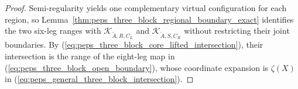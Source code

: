 \begin{proof}\leanok
    Semi-regularity yields one complementary virtual configuration for
    each region, so Lemma~\ref{thm:peps_three_block_regional_boundary_exact}
    identifies the two six-leg ranges with
    $\mathcal K_{\widetilde A,R,C_L}$ and
    $\mathcal K_{\widetilde A,S,C_R}$ without restricting their joint
    boundaries. By (\ref{eq:peps_three_block_core_lifted_intersection}),
    their intersection is the range of the eight-leg map in
    (\ref{eq:peps_three_block_open_boundary}), whose coordinate expansion
    is $\zeta(X)$ in (\ref{eq:peps_general_three_block_intersection}).
\end{proof}
